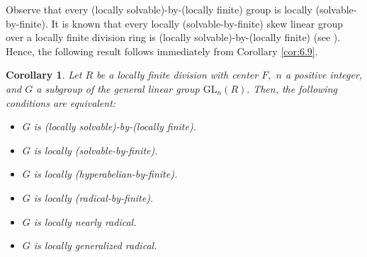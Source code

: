 \documentclass{amsart}
\newtheorem{corollary}[theorem]{Corollary}
\theoremstyle{definition}
\begin{document}
Observe that every (locally solvable)-by-(locally finite) group is locally (solvable-by-finite). It is known that every  locally (solvable-by-finite) skew linear group over a locally finite division ring is (locally solvable)-by-(locally finite) (see \cite[3.3.9]{Pa_ShWe_86}). Hence, the following result follows immediately from Corollary \ref{cor:6.9}.
\begin{corollary}\label{cor:6.10}
Let $R$ be a locally finite division with center $F,$ $n$ a positive integer, and $G$ a subgroup of the general linear group $\mathrm{GL}_n(R).$ Then, the following conditions are equivalent:
	\begin{itemize}
		\item [(1)] $G$ is (locally solvable)-by-(locally finite).
		\item [(2)] $G$ is locally (solvable-by-finite).
		\item [(3)] $G$ is locally  (hyperabelian-by-finite).
		\item [(4)] $G$ is locally (radical-by-finite).
		\item [(5)] $G$ is locally nearly radical.
		\item [(6)] $G$ is locally generalized radical.
	\end{itemize}
\end{corollary}
 
\end{document}
